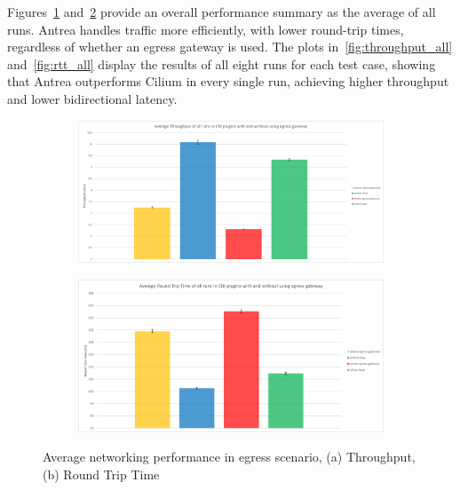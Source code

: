 Figures~\ref{fig:throughput_avg} and~\ref{fig:rtt_avg} provide an overall performance summary as the average of all runs. Antrea handles traffic more efficiently, with lower round-trip times, regardless of whether an egress gateway is used. The plots in~\ref{fig:throughput_all} and~\ref{fig:rtt_all} display the results of all eight runs for each test case, showing that Antrea outperforms Cilium in every single run, achieving higher throughput and lower bidirectional latency.

\begin{figure}[H]
    \centering
    \begin{subfigure}[b]{0.9\textwidth}
        \includegraphics[width=\textwidth]{plots/egress/throughput_total_average.png}
        \caption{}
        \label{fig:throughput_avg}
    \end{subfigure}
    \begin{subfigure}[b]{0.9\textwidth}
        \includegraphics[width=\textwidth]{plots/egress/rtt_total_average.png}
        \caption{}
        \label{fig:rtt_avg}
    \end{subfigure}
    
    \caption{Average networking performance in egress scenario, (a) Throughput, (b) Round Trip Time}
    \label{fig:networking_avg}
\end{figure}

